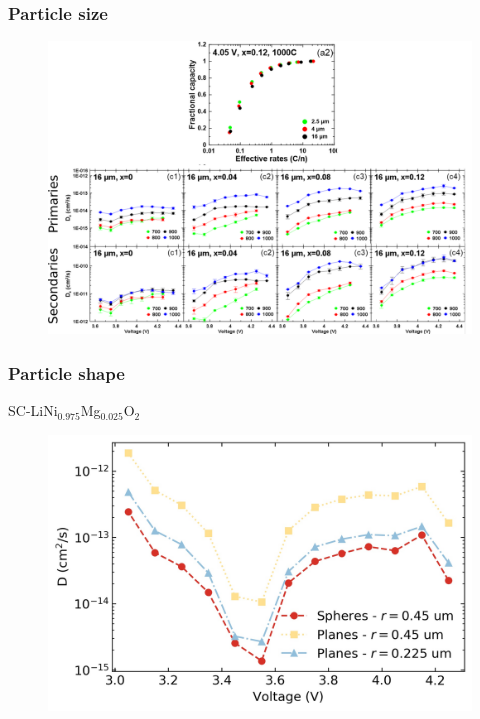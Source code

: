 \documentclass{beamer}
\begin{document}
\begin{frame}
\begin{columns}
\end{columns}

\end{frame}

\begin{frame}
\frametitle{Particle size}

\begin{figure}
	\includegraphics[width=0.85\linewidth]{figs/prim_vs_sec_particles.pdf}
\end{figure}

\end{frame}

\begin{frame}
\frametitle{Particle shape}

\centering
SC-LiNi$_{0.975}$Mg$_{0.025}$O$_2$
\begin{figure}
	\includegraphics[width=0.75\linewidth]{figs/SC_Ni975Mg025_09um_30C_D-V_compare_sphere-plane.jpg}
\end{figure}

\end{frame}
\end{document}
